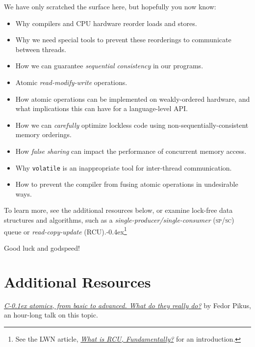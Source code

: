 \documentclass[fontsize=10pt, oneside]{scrartcl}
\newcommand{\punckern}{\kern-0.4ex}
\newcommand{\monobox}[1]{\mbox{\texttt{#1}}}
\newcommand{\keyword}[1]{\monobox{\color{darkGreen}#1}}
\newcommand{\cplusplus}[1]{C\kern-0.1ex\raisebox{0.15ex}{\texttt{++}}}
\newcommand{\introduce}[1]{\textit{#1}}
\begin{document}
We have only scratched the surface here, but hopefully you now know:
\begin{itemize}
\item Why compilers and \textsc{CPU} hardware reorder loads and stores.
\item Why we need special tools to prevent these reorderings to communicate between threads.
\item How we can guarantee \introduce{sequential consistency} in our programs.
\item Atomic \introduce{read-modify-write} operations.
\item How atomic operations can be implemented on weakly-ordered hardware,
      and what implications this can have for a language-level \textsc{API}.
\item How we can \emph{carefully} optimize lockless code using non-sequentially-consistent memory orderings.
\item How \introduce{false sharing} can impact the performance of concurrent memory access.
\item Why \keyword{volatile} is an inappropriate tool for inter-thread communication.
\item How to prevent the compiler from fusing atomic operations in undesirable ways.
\end{itemize}
To learn more, see the additional resources below,
or examine lock-free data structures and algorithms,
such as a \introduce{single-producer/single-consumer} (\textsc{sp/sc}) queue or \introduce{read-copy-update}
(\textsc{RCU}).\punckern\footnote{%
See the LWN article,
\href{https://lwn.net/Articles/262464/}{\textit{What is RCU, Fundamentally?}} for an introduction.}

\vspace{\baselineskip}
\noindent Good luck and godspeed!
\newpage

\appendix
\setcounter{secnumdepth}{0}
\setfootnoterule{0pt}

\setlength\parskip{\baselineskip}
\setlength\parindent{0pt}
\section{Additional Resources}

\href{https://www.youtube.com/watch?v=ZQFzMfHIxng}{%
\textit{\cplusplus{} atomics, from basic to advanced. What do they really do?}}
by Fedor Pikus,
an hour-long talk on this topic.
\end{document}
